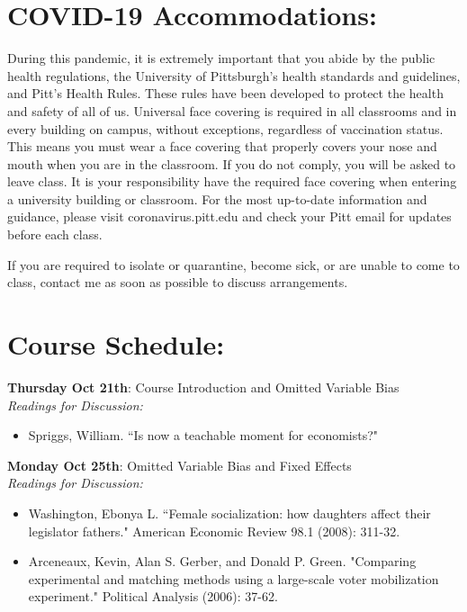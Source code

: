 \documentclass[a4paper, 10pt]{article}
\begin{document}
\section*{COVID-19 Accommodations:}
 
During this pandemic, it is extremely important that you abide by the public health regulations, the University of Pittsburgh’s health standards and guidelines, and Pitt’s Health Rules. These rules have been developed to protect the health and safety of all of us.  Universal face covering is required in all classrooms and in every building on campus, without exceptions, regardless of vaccination status. This means you must wear a face covering that properly covers your nose and mouth when you are in the classroom. If you do not comply, you will be asked to leave class.  It is your responsibility have the required face covering when entering a university building or classroom. For the most up-to-date information and guidance, please visit coronavirus.pitt.edu and check your Pitt email for updates before each class.

\noindent If you are required to isolate or quarantine, become sick, or are unable to come to class, contact me as soon as possible to discuss arrangements.


\section*{Course Schedule:}


\textbf{Thursday Oct 21th}:  Course Introduction and Omitted Variable Bias\\
\textit{Readings for Discussion:}
\begin{itemize}
\item  Spriggs, William. ``Is now a teachable moment for economists?"
\end{itemize}



\noindent \textbf{Monday Oct 25th}: Omitted Variable Bias  and  Fixed Effects\\
\textit{Readings for Discussion:}
\begin{itemize}
\item  Washington, Ebonya L. ``Female socialization: how daughters affect their legislator fathers." American Economic Review 98.1 (2008): 311-32. 
\item  Arceneaux, Kevin, Alan S. Gerber, and Donald P. Green. "Comparing experimental and matching methods using a large-scale voter mobilization experiment." Political Analysis (2006): 37-62.
\end{itemize}
\end{document}
